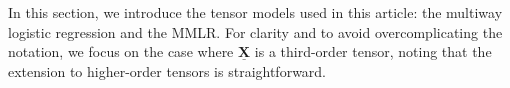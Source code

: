 \documentclass[preprint,12pt]{elsarticle}
\begin{document}
\noindent In this section, we introduce the tensor models used in this article: the multiway logistic regression and the MMLR. For clarity and to avoid overcomplicating the notation, we focus on the case where $\underline{\mathbf{X}}$ is a third-order tensor, noting that the extension to higher-order tensors is straightforward. 
\end{document}
